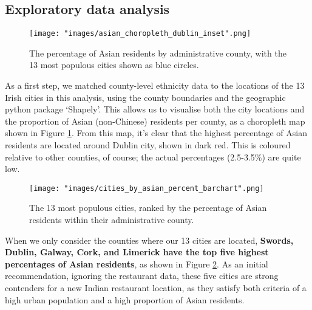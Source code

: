 \documentclass[a4paper,11pt]{article}
\begin{document}
\subsection{Exploratory data analysis}\label{sec: EDA}
%
\begin{figure}[htb]
   \centering
   \texttt{[image: "images/asian\_choropleth\_dublin\_inset".png]}
      \caption{The percentage of Asian residents by administrative county, with the 13 most populous cities shown as blue circles.}
      \label{fig: ethnicity choropleth}
\end{figure}
%
As a first step, we matched county-level ethnicity data to the locations of the 13 Irish cities in this analysis, using the county boundaries and the geographic python package `Shapely'. This allows us to visualise both the city locations and the proportion of Asian (non-Chinese) residents per county, as a choropleth map shown in Figure \ref{fig: ethnicity choropleth}. From this map, it's clear that the highest percentage of Asian residents are located around Dublin city, shown in dark red. This is coloured relative to other counties, of course; the actual percentages (2.5-3.5\%) are quite low. 
%
\begin{figure}[htb]
   \centering
   \texttt{[image: "images/cities\_by\_asian\_percent\_barchart".png]}
      \caption{The 13 most populous cities, ranked by the percentage of Asian residents within their administrative county.}
      \label{fig:city by ethnicity}
\end{figure}
%

When we only consider the counties where our 13 cities are located, \textbf{Swords, Dublin, Galway, Cork, and Limerick have the top five highest percentages of Asian residents}, as shown in Figure \ref{fig:city by ethnicity}. As an initial recommendation, ignoring the restaurant data, these five cities are strong contenders for a new Indian restaurant location, as they satisfy both criteria of a high urban population and a high proportion of Asian residents.
\end{document}
